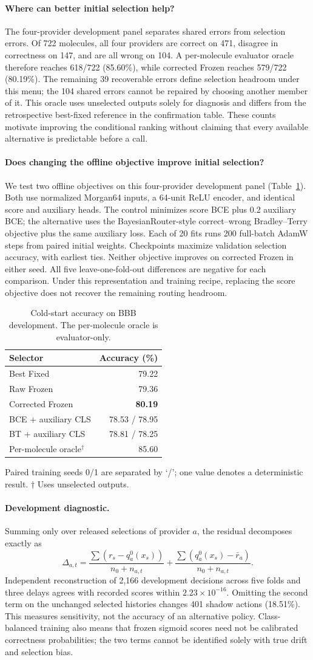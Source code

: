 \documentclass[sigconf,anonymous]{aamas}
\makeatletter
\newcommand{\MiraTableFont}{\fontsize{9}{11}\selectfont}
\newcommand{\tnote}[1]{{\fontsize{8.5}{10}\selectfont\raggedright\par\vspace{3pt}#1\par}}
\newcommand{\MiraPriorCaption}{Cold-start accuracy on BBB development. The per-molecule oracle is evaluator-only.}
\newcommand{\MiraPriorLabels}{\label{tab:learned-prior}}
\newcommand{\MiraPriorBody}{%
\begingroup\centering\MiraTableFont\setlength{\tabcolsep}{9pt}\renewcommand{\arraystretch}{1.08}
\begin{tabular}{@{}lr@{}}
\toprule
Selector & Accuracy (\%) \\
\midrule
Best Fixed & 79.22 \\
Raw Frozen & 79.36 \\
Corrected Frozen & \textbf{80.19} \\
\midrule
BCE + auxiliary CLS & 78.53 / 78.95 \\
BT + auxiliary CLS & 78.81 / 78.25 \\
\midrule
Per-molecule oracle$^{\dagger}$ & 85.60 \\
\bottomrule
\end{tabular}\par
\tnote{Paired training seeds 0/1 are separated by `/'; one value denotes a deterministic result. $\dagger$ Uses unselected outputs.}
\endgroup}
\makeatother
\begin{document}
\paragraph{Where can better initial selection help?}
The four-provider development panel separates shared errors from selection errors. Of 722 molecules, all four providers are correct on 471, disagree in correctness on 147, and are all wrong on 104. A per-molecule evaluator oracle therefore reaches 618/722 (85.60\%), while corrected Frozen reaches 579/722 (80.19\%). The remaining 39 recoverable errors define selection headroom under this menu; the 104 shared errors cannot be repaired by choosing another member of it. This oracle uses unselected outputs solely for diagnosis and differs from the retrospective best-fixed reference in the confirmation table. These counts motivate improving the conditional ranking without claiming that every available alternative is predictable before a call.

\paragraph{Does changing the offline objective improve initial selection?}
We test two offline objectives on this four-provider development panel (Table~\ref{tab:learned-prior}). Both use normalized Morgan64 inputs, a 64-unit ReLU encoder, and identical score and auxiliary heads. The control minimizes score BCE plus 0.2 auxiliary BCE; the alternative uses the BayesianRouter-style correct--wrong Bradley--Terry objective plus the same auxiliary loss. Each of 20 fits runs 200 full-batch AdamW steps from paired initial weights. Checkpoints maximize validation selection accuracy, with earliest ties. Neither objective improves on corrected Frozen in either seed. All five leave-one-fold-out differences are negative for each comparison. Under this representation and training recipe, replacing the score objective does not recover the remaining routing headroom.

\begin{table}[t]
\caption{\MiraPriorCaption}
\MiraPriorLabels
\MiraPriorBody
\end{table}


\paragraph{Development diagnostic.}
Summing only over released selections of provider $a$, the residual decomposes exactly as
\begin{equation}
\Delta_{a,t}=\frac{\sum(r_s-q_a^0(x_s))}{n_0+n_{a,t}}
            +\frac{\sum(q_a^0(x_s)-\bar r_a)}{n_0+n_{a,t}}.
\end{equation}
Independent reconstruction of 2,166 development decisions across five folds and three delays agrees with recorded scores within $2.23\times10^{-16}$. Omitting the second term on the unchanged selected histories changes 401 shadow actions (18.51\%). This measures sensitivity, not the accuracy of an alternative policy. Class-balanced training also means that frozen sigmoid scores need not be calibrated correctness probabilities; the two terms cannot be identified solely with true drift and selection bias.
\end{document}
